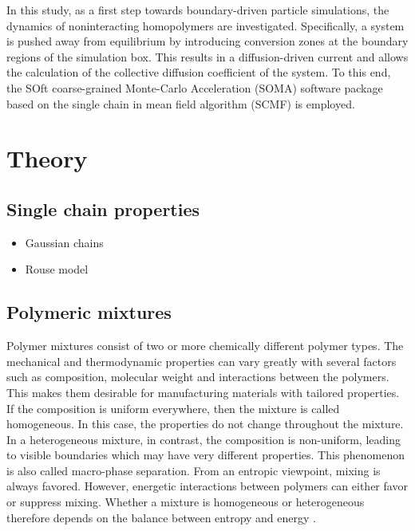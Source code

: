 \documentclass[bachelor,       %
               twoside,        %
               BCOR10mm,       %
                ngerman,english  %
               ]{GAUBM}
\begin{document}
In this study, as a first step towards boundary-driven particle simulations, the dynamics of noninteracting homopolymers are investigated. Specifically, a system is pushed away from equilibrium by introducing conversion zones at the boundary regions of the simulation box. This results in a diffusion-driven current and allows the calculation of the collective diffusion coefficient of the system. To this end, the SOft coarse-grained Monte-Carlo Acceleration (SOMA) \cite{Schneider_soma} software package based on the single chain in mean field algorithm (SCMF) \cite{Daoulas06} is employed.



\chapter{Theory}

\section{Single chain properties}

\begin{itemize}
  \item Gaussian chains
  \item Rouse model
\end{itemize}

\section{Polymeric mixtures}
Polymer mixtures consist of two or more chemically different polymer types. The mechanical and thermodynamic properties can vary greatly with several factors such as composition, molecular weight and interactions between the polymers. This makes them desirable for manufacturing materials with tailored properties.\\
If the composition is uniform everywhere, then the mixture is called homogeneous. In this case, the properties do not change throughout the mixture. In a heterogeneous mixture, in contrast, the composition is non-uniform, leading to visible boundaries which may have very different properties. This phenomenon is also called macro-phase separation. From an entropic viewpoint, mixing is always favored. However, energetic interactions between polymers can either favor or suppress mixing. Whether a mixture is homogeneous or heterogeneous therefore depends on the balance between entropy and energy \cite[S. 137]{Rubin03}.           
\end{document}
